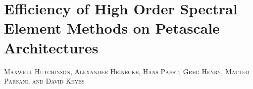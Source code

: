\newcommand{\pluseq}{\mathrel{+}=}

\renewcommand{\ttdefault}{pcr}


\chapter{Efficiency of High Order Spectral Element Methods on Petascale Architectures}

\makeatletter
\newcommand{\chapterauthor}[1]{%
  {\parindent0pt\vspace*{-25pt}%
  \linespread{1.1}\large\scshape#1%
  \par\nobreak\vspace*{35pt}}
  \@afterheading%
}
\makeatother

\vspace{20pt}

\chapterauthor{Maxwell Hutchinson, Alexander Heinecke, Hans Pabst, Greg Henry, Matteo Parsani, and David Keyes}


%
%






